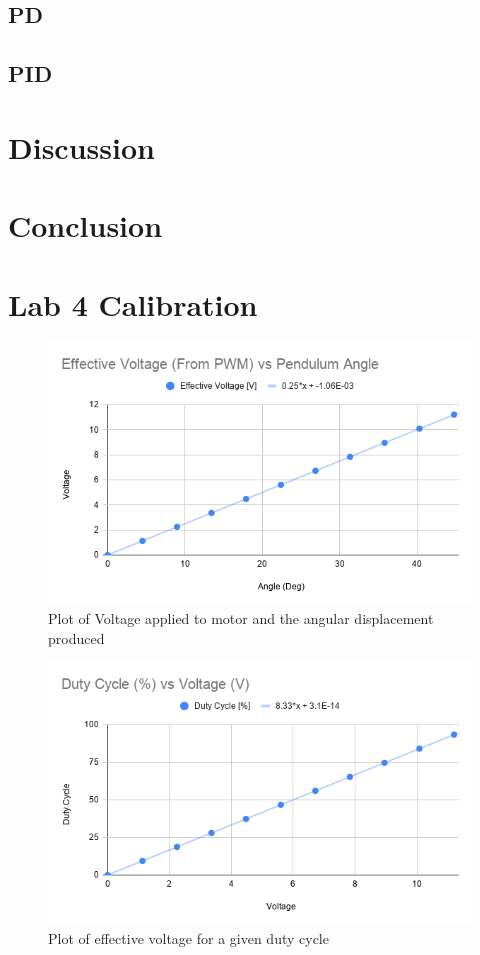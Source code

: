 \documentclass[a4paper, 11pt, compsoc]{IEEEtran}
\begin{document}
        \subsection{PD}\label{sec:pd}
        \subsection{PID}\label{sec:pid}
    \section{Discussion}\label{sec:disc}
    \section{Conclusion}\label{sec:conc}


    \onecolumn
	\appendices
		\section{Lab 4 Calibration} \label{app:calibration}
			\begin{figure}[!ht]
				\centering
				\includegraphics[width=0.8\columnwidth]{angleVoltage.png}
				\caption{Plot of Voltage applied to motor and the angular displacement produced}
				\label{fig:voltAngle}
			\end{figure}

			\begin{figure}[!ht]
				\centering
				\includegraphics[width=0.8\columnwidth]{dutyCycleVoltage.png}
				\caption{Plot of effective voltage for a given duty cycle}
				\label{fig:DCV}
			\end{figure}
\end{document}
